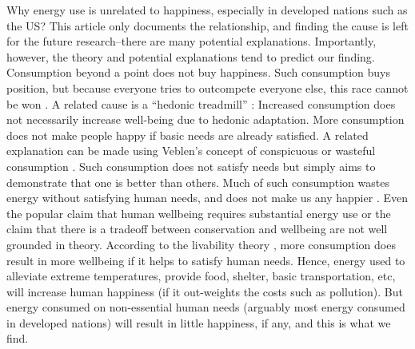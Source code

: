 \documentclass[10pt, letterpaper]{article}
\begin{document}
\begin{spacing}{1.5}
Why energy use is unrelated to happiness, especially in developed nations such
as the US? This article only
documents the relationship, and finding the cause is left for the future
research--there are many potential explanations. Importantly, however, the
theory and potential explanations tend to predict our finding. 
Consumption beyond a point does not buy happiness. Such consumption buys
position, but because everyone tries to outcompete everyone else, this race
cannot be won \citep{frank12,kasser13}. A related cause is a ``hedonic treadmill'' \citep{brickman78cj}:
Increased consumption does not necessarily increase well-being due to
hedonic adaptation. More consumption does not make people happy if basic needs
are already satisfied. %
 A related explanation can be made using Veblen's concept of conspicuous or
 wasteful consumption \citep{veblen05a, veblen05b}. Such consumption does not
 satisfy needs but simply aims to demonstrate that
one is better than others. Much of such consumption wastes energy without
satisfying human needs, %
%
 and  does not make us any happier  \citep{csikszentmihalyi99, frank04, frank05,
   frank12}. %
  Even the popular claim that human wellbeing requires substantial energy use or
 the claim that there is a tradeoff between conservation and wellbeing are not
 well grounded in theory. According to the livability theory
 \citep{veenhoven14b}, more consumption does result in more wellbeing if it
 helps to satisfy human needs. Hence, energy used to alleviate extreme
 temperatures, provide food, shelter, basic transportation, etc, will increase
 human happiness (if it out-weights the costs such as pollution). But energy
 consumed on non-essential human needs (arguably most energy consumed in
 developed nations) will result in little happiness, if any, and this is what we
 find.  


\end{spacing}
\end{document}
